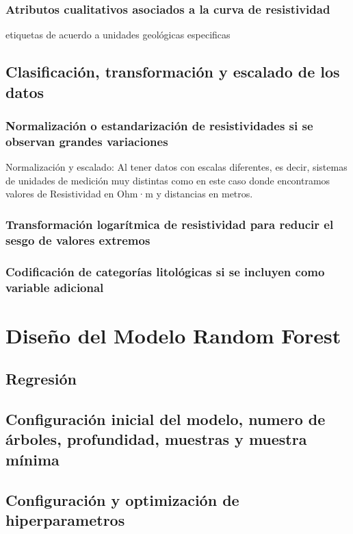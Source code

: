 		\subsubsection{Atributos cualitativos asociados a la curva de resistividad}
			
			etiquetas de acuerdo a unidades geológicas especificas

	\subsection{Clasificación, transformación y escalado de los datos}
	
		\subsubsection{Normalización o estandarización de resistividades si se observan grandes variaciones}
		
		Normalización y escalado: Al tener datos con escalas diferentes, es decir, sistemas de unidades de medición muy distintas como en este caso donde encontramos valores de Resistividad en Ohm·m y distancias en metros.
		 
		\subsubsection{Transformación logarítmica de resistividad para reducir el sesgo de valores extremos}
		\subsubsection{Codificación de categorías litológicas si se incluyen como variable adicional}

\section{Diseño del Modelo Random Forest}
	\subsection{Regresión}
	\subsection{Configuración inicial del modelo, numero de árboles, profundidad, muestras y muestra mínima}
	\subsection{Configuración y optimización de hiperparametros}

